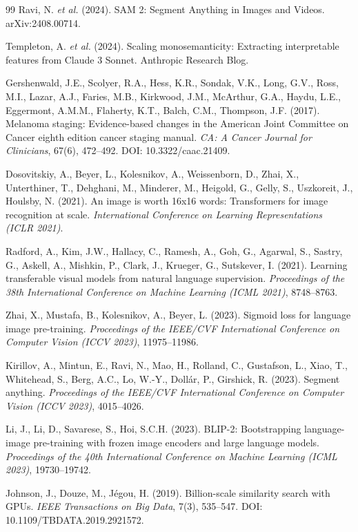 \begin{thebibliography}{99}
Ravi, N. \emph{et al.} (2024). SAM 2: Segment Anything in Images and Videos. arXiv:2408.00714.

Templeton, A. \emph{et al.} (2024). Scaling monosemanticity: Extracting interpretable features from Claude 3 Sonnet. Anthropic Research Blog.

Gershenwald, J.E., Scolyer, R.A., Hess, K.R., Sondak, V.K., Long, G.V., Ross, M.I., Lazar, A.J., Faries, M.B., Kirkwood, J.M., McArthur, G.A., Haydu, L.E., Eggermont, A.M.M., Flaherty, K.T., Balch, C.M., Thompson, J.F. (2017). Melanoma staging: Evidence-based changes in the American Joint Committee on Cancer eighth edition cancer staging manual. \emph{CA: A Cancer Journal for Clinicians}, 67(6), 472--492. DOI: 10.3322/caac.21409.

Dosovitskiy, A., Beyer, L., Kolesnikov, A., Weissenborn, D., Zhai, X., Unterthiner, T., Dehghani, M., Minderer, M., Heigold, G., Gelly, S., Uszkoreit, J., Houlsby, N. (2021). An image is worth 16x16 words: Transformers for image recognition at scale. \emph{International Conference on Learning Representations (ICLR 2021)}.

Radford, A., Kim, J.W., Hallacy, C., Ramesh, A., Goh, G., Agarwal, S., Sastry, G., Askell, A., Mishkin, P., Clark, J., Krueger, G., Sutskever, I. (2021). Learning transferable visual models from natural language supervision. \emph{Proceedings of the 38th International Conference on Machine Learning (ICML 2021)}, 8748--8763.

Zhai, X., Mustafa, B., Kolesnikov, A., Beyer, L. (2023). Sigmoid loss for language image pre-training. \emph{Proceedings of the IEEE/CVF International Conference on Computer Vision (ICCV 2023)}, 11975--11986.

Kirillov, A., Mintun, E., Ravi, N., Mao, H., Rolland, C., Gustafson, L., Xiao, T., Whitehead, S., Berg, A.C., Lo, W.-Y., Dollár, P., Girshick, R. (2023). Segment anything. \emph{Proceedings of the IEEE/CVF International Conference on Computer Vision (ICCV 2023)}, 4015--4026.

Li, J., Li, D., Savarese, S., Hoi, S.C.H. (2023). BLIP-2: Bootstrapping language-image pre-training with frozen image encoders and large language models. \emph{Proceedings of the 40th International Conference on Machine Learning (ICML 2023)}, 19730--19742.

Johnson, J., Douze, M., Jégou, H. (2019). Billion-scale similarity search with GPUs. \emph{IEEE Transactions on Big Data}, 7(3), 535--547. DOI: 10.1109/TBDATA.2019.2921572.


\end{thebibliography}
